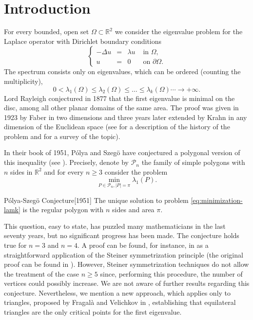 \documentclass[11pt]{article}
\numberwithin{equation}{section}\newtheorem*{jepEnonce}{\jepEnonceTitle}\newenvironment{enonce*}[1]{\def\jepEnonceTitle{#1}\jepEnonce}{\endjepEnonce}\newtheorem*{conj*}{Conjecture}
\theoremstyle{plain}
\theoremstyle{definition}
\newcommand{\Pol}[1]{\mathcal P_{#1}}
\let\Bbb\mathbb
\newcommand{\Om}{\Omega}
\newcommand{\lb}{\lambda}
\begin{document}

\section{Introduction}

For every bounded, open set $\Omega \subset \Bbb{R}^2$ we consider the eigenvalue problem for the Laplace operator with Dirichlet boundary conditions
\begin{equation}\left\{ \begin{array}{rcll}
-\Delta u & =& \lambda u & \text{ in }\Omega,\\
u &= &0 & \text{ on }\partial \Omega.
\end{array} \right.
\label{eq:dir-eigenvalue}
\end{equation}
The spectrum consists only on eigenvalues, which can be ordered (counting the multiplicity),
\[
0< \lb_1(\Om) \le \lb_2(\Om) \le \dots \le \lb_k(\Om) \cdots \to +\infty.
\]
Lord Rayleigh conjectured in 1877 that the first eigenvalue is minimal on the disc, among all other planar domains of the same area. The proof was given in 1923 by Faber in two dimensions and three years later extended by Krahn in any dimension of the Euclidean space (see \cite{Da11} for a description of the history of the problem and \cite{he17b,henroteigs} for a survey of the topic).

In their book of 1951, Pólya and Szegö have conjectured a polygonal version of this inequality (see \cite[p.\,158]{PoSz51}). Precisely, denote by $\Pol{n}$ the family of simple polygons with $n$ sides in $\Bbb{R}^2$ and for every $n \geq 3$ consider the problem
\begin{equation}
\min_{P \in \Pol n, |P| = \pi} \lambda_1(P).
\label{eq:minimization-lamk}
\end{equation}

\begin{enonce*}{Pólya-Szegö Conjecture}[1951]
The unique solution to problem \eqref{eq:minimization-lamk} is the regular polygon with $n$ sides and area $\pi$.
\end{enonce*}

This question, easy to state, has puzzled many mathematicians in the last seventy years, but no significant progress has been made.
The conjecture holds true for $n=3$ and $n=4$. A proof can be found, for instance, in \cite{henroteigs} as a straightforward application of the Steiner symmetrization principle (the original proof can be found in \cite{PoSz51}). However, Steiner symmetrization techniques do not allow the treatment of the case $n \geq 5$ since, performing this procedure, the number of vertices could possibly increase. We are not aware of further results regarding this conjecture. Nevertheless, we mention a new approach, which applies only to triangles, proposed by Fragalà and Velichkov in \cite{FragalaVelichkov19}, establishing that equilateral triangles are the only critical points for the first eigenvalue.
\end{document}
